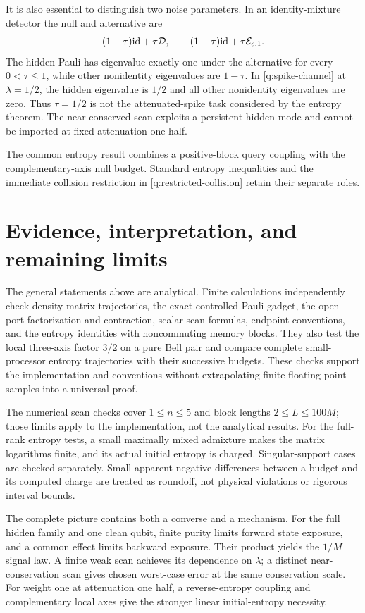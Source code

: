 \documentclass[11pt,a4paper]{article}
\numberwithin{equation}{section}
\theoremstyle{definition}
\theoremstyle{remark}
\begin{document}
It is also essential to distinguish two noise parameters. In an
identity-mixture detector the null and alternative are
\[
 (1-\tau){\rm id}+\tau\mathcal D,\qquad
 (1-\tau){\rm id}+\tau\mathcal E_{e,1}.
\]
The hidden Pauli has eigenvalue exactly one under the alternative for every
$0<\tau\leq1$, while other nonidentity eigenvalues are $1-\tau$.
In \eqref{q:spike-channel} at $\lambda=1/2$, the hidden eigenvalue is $1/2$
and all other nonidentity eigenvalues are zero. Thus $\tau=1/2$ is not the
attenuated-spike task considered by the entropy theorem. The near-conserved
scan exploits a persistent hidden mode and cannot be imported at fixed
attenuation one half.

The common entropy result combines a positive-block query coupling with the
complementary-axis null budget. Standard entropy inequalities and the immediate
collision restriction in \eqref{q:restricted-collision} retain their separate
roles.

\section{Evidence, interpretation, and remaining limits}

The general statements above are analytical. Finite calculations independently
check density-matrix trajectories, the exact controlled-Pauli gadget, the
open-port factorization and contraction, scalar scan formulas, endpoint
conventions, and the entropy identities with noncommuting memory blocks.
They also test the local three-axis factor $3/2$ on a pure Bell pair and compare
complete small-processor entropy trajectories with their successive budgets.
These checks support the implementation and conventions without extrapolating
finite floating-point samples into a universal proof.

The numerical scan checks cover $1\leq n\leq5$ and block lengths
$2\leq L\leq100M$; those limits apply to the implementation, not the
analytical results. For the full-rank entropy tests, a small maximally mixed
admixture makes the matrix logarithms finite, and its actual initial entropy
is charged. Singular-support cases are checked separately. Small apparent
negative differences between a budget and its computed charge are treated
as roundoff, not physical violations or rigorous interval bounds.

The complete picture contains both a converse and a mechanism. For the full
hidden family and one clean qubit, finite purity limits forward state exposure,
and a common effect limits backward exposure. Their product yields the
$1/M$ signal law. A finite weak scan achieves its dependence on $\lambda$;
a distinct near-conservation scan gives chosen worst-case error at the same
conservation scale. For weight one at attenuation one half, a reverse-entropy
coupling and complementary local axes give the stronger linear initial-entropy
necessity.
\end{document}
